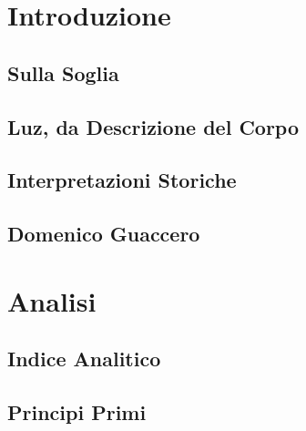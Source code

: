 \documentclass[11pt,a4paper]{book}
\begin{document}
\frontmatter
\tableofcontents
\clearpage


\clearpage

\mainmatter

\part{Introduzione}

\chapter{Sulla Soglia}


\chapter{Luz, da Descrizione del Corpo}


\chapter{Interpretazioni Storiche}


\chapter{Domenico Guaccero}


\part{Analisi}

\chapter{Indice Analitico}


\chapter{Principi Primi}

\end{document}
